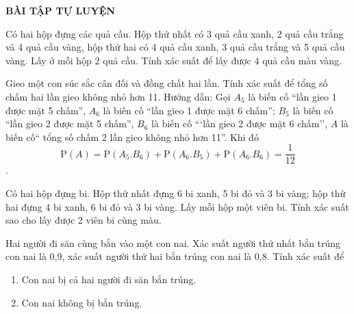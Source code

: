 \begin{center}
	\textbf{BÀI TẬP TỰ LUYỆN}
\end{center}
\begin{bt}%
	Có hai hộp đựng các quả cầu. Hộp thứ nhất có 3 quả cầu xanh, 2 quả cầu trắng và 4 quả cầu vàng, hộp thứ hai có 4 quả cầu xanh, 3 quả cầu trắng và 5 quả cầu vàng. Lấy ở mỗi hộp 2 quả cầu. Tính xác suất để lấy được 4 quả cầu màu vàng.
\end{bt}
\begin{bt}%
	Gieo một con súc sắc cân đối và đồng chất hai lần. Tính xác suất để tổng số chấm hai lần gieo không nhỏ hơn 11.
	\loigiai
	{Hướng dẫn: Gọi $A_5$ là biến cố ``lần gieo 1 được mặt 5 chấm'', $A_6$ là biến cố ``lần gieo 1 được mặt 6 chấm''; $B_5$ là biến cố ``lần gieo 2 được mặt 5 chấm'', $B_6$ là biến cố ```lần gieo 2 được mặt 6 chấm'', $A$ là biến cố`` tổng số chấm 2 lần gieo không nhỏ hơn 11''. Khi đó $$\mathrm{P}(A)=\mathrm{P}(A_5.B_6)+\mathrm{P}(A_6.B_5)+\mathrm{P}(A_6.B_6)=\dfrac{1}{12}$$.
	}
\end{bt}
\begin{bt}%
	Có hai hộp đựng bi. Hộp thứ nhất đựng 6 bi xanh, 5 bi đỏ và 3 bi vàng; hộp thứ hai đựng 4 bi xanh, 6 bi đỏ và 3 bi vàng. Lấy mỗi hộp một viên bi. Tính xác suất sao cho lấy được 2 viên bi cùng màu.
\end{bt}
\begin{bt}%
	Hai người đi săn cùng bắn vào một con nai. Xác suất người thứ nhất bắn trúng con nai là 0,9, xác suất người thứ hai bắn trúng con nai là 0,8. Tính xác suất để 
	\begin{enumerate}[\indent a.]
		\item Con nai bị cả hai người đi săn bắn trúng.
		\item Con nai không bị bắn trúng.
	\end{enumerate}
\end{bt}
